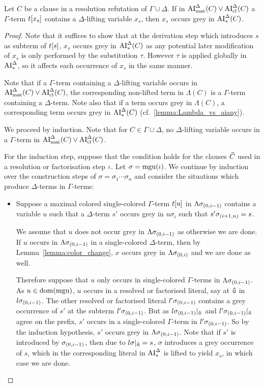 \documentclass[,%
	draft=false,%
	numbers=noendperiod
	11pt,
	a4paper,
	oneside,%
	openany,
]{memoir}
\begin{document}
\begin{lemma}
	\label{lemma:lft_var_occurs_grey}
	Let $C$ be a clause in a resolution refutation of $\Gamma \cup \Delta$.
	If in $\operatorname{AI}_\mathrm{mat}^\Delta(C) \lor \operatorname{AI}_\mathrm{cl}^\Delta(C)$	a $\Gamma$-term $t[x_s]$ contains a $\Delta$-lifting variable $x_s$, then $x_s$ occurs grey in $\operatorname{AI}_\mathrm{*}^\Delta(C)$.

\end{lemma}
\begin{proof}
	Note that it suffices to show that at the derivation step which introduces $s$ as subterm of $t[s]$, $x_s$ occurs grey in $\operatorname{AI}_\mathrm{*}^\Delta(C)$ as any potential later modification of $x_s$ is only performed by the substitution $\tau$. 
	However $\tau$ is applied globally in $\operatorname{AI}_\mathrm{*}^\Delta$, so it affects each occurrence of $x_s$ in the same manner.

	Note that if a $\Gamma$-term containing a $\Delta$-lifting variable occurs in $\operatorname{AI}_\mathrm{mat}^\Delta(C) \lor \operatorname{AI}_\mathrm{cl}^\Delta(C)$, the corresponding non-lifted term in $\Lambda(C)$ is a $\Gamma$-term containing a $\Delta$-term.
	Note also that if a term occurs grey in $\Lambda(C)$, a corresponding term occurs grey in $\operatorname{AI}_\mathrm{*}^\Delta(C)$ (cf.\ \ref{lemma:Lambda_vs_aiany}).

	We proceed by induction.
	Note that for $C\in \Gamma\cup\Delta$, no $\Delta$-lifting variable occurs in a $\Gamma$-term in $\operatorname{AI}_\mathrm{mat}^\Delta(C) \lor \operatorname{AI}_\mathrm{cl}^\Delta(C)$.

	For the induction step, suppose that the condition holds for the clauses $\bm\bar C$ used in a resolution or factorisation step $\iota$.
	Let $\sigma = \operatorname{mgu}(\iota)$.
	We continue by induction over the construction steps of $\sigma = \sigma_1 \cdots \sigma_n$ and consider the situations which produce $\Delta$-terms in $\Gamma$-terms:
	\begin{itemize}
		\item Suppose a maximal colored single-colored $\Gamma$-term $t[u]$ in $\Lambda\sigma_{(0,i-1)}$ contains a variable $u$ such that a $\Delta$-term $s'$ occurs grey in $u\sigma_i$ such that $s'\sigma_{(i+1,n)} = s$.

			We assume that $u$ does not occur grey in $\Lambda\sigma_{(0,i-1)}$ as otherwise we are done.
			If $u$ occurs in $\Lambda\sigma_{(0,i-1)}$ in a single-colored $\Delta$-term, then by Lemma~\ref{lemma:color_change}, $x$ occurs grey in $\Lambda\sigma_{(0,i)}$ and we are done as well.

			Therefore suppose that $u$ only occurs in single-colored $\Gamma$-terms in $\Lambda\sigma_{(0,i-1)}$.
			As $u\in\operatorname{dom}(\operatorname{mgu})$, $u$ occurs in a resolved or factorised literal, say at $\bm\hat u$ in $l\sigma_{(0,i-1)}$.
			The other resolved or factorised literal $l'\sigma_{(0,i-1)}$ contains a grey occurrence of $s'$ at the subterm $l'\sigma_{(0,i-1)}$.
			But as $l\sigma_{(0,i-1)}|_{\bm\hat u}$ and $l'\sigma_{(0,i-1)}|_{\bm\hat u}$ agree on the prefix, $s'$ occurs in a single-colored $\Gamma$-term in $l'\sigma_{(0,i-1)}$.
			So by the induction hypothesis, $s'$ occurs grey in $\Lambda\sigma_{(0,i-1)}$.
			Note that if $s'$ is introduced by $\sigma_{(0,i-1)}$, then due to $l\sigma|_{\bm\hat u} = s$, $\sigma$ introduces a grey occurrence of $s$, which in the corresponding literal in $\operatorname{AI}_\mathrm{*}^\Delta$ is lifted to yield $x_s$, in which case we are done.


\end{itemize}
\end{proof}
\end{document}
